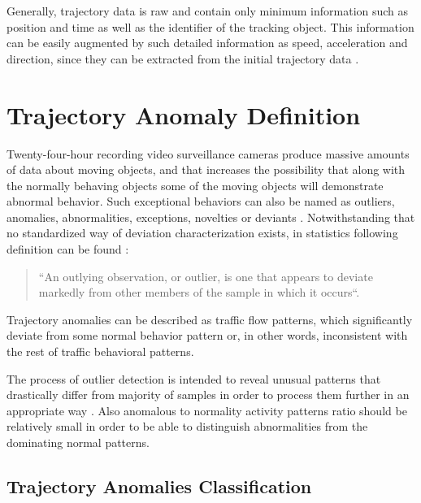 Generally, trajectory data is raw and contain only minimum information such as position and time as well as the identifier of the tracking object. This information can be easily augmented by such detailed information as speed, acceleration and direction, since they can be extracted from the initial trajectory data \cite{article:12_dssto_mot}.

\section{Trajectory Anomaly Definition}

Twenty-four-hour recording video surveillance cameras produce massive amounts of data about moving objects, and that increases the possibility that along with the normally behaving objects some of the moving objects will demonstrate abnormal behavior. Such exceptional behaviors can also be named as outliers, anomalies, abnormalities, exceptions, novelties or deviants \cite{article:11_eod_hdd}\cite{article:15_survey_ad}. Notwithstanding that no standardized way of deviation characterization exists, in statistics following definition can be found \cite{article:13_pdoos}:
\begin{quote}
	``An outlying observation, or outlier, is one that appears to deviate markedly from other members of the sample in which it occurs``.
\end{quote}

Trajectory anomalies can be described as traffic flow patterns, which significantly deviate from some normal behavior pattern or, in other words, inconsistent with the rest of traffic behavioral patterns.
 
The process of outlier detection is intended to reveal unusual patterns that drastically differ from majority of samples in order to process them further in an appropriate way \cite{article:11_eod_hdd}. Also anomalous to normality activity patterns ratio should be relatively small in order to be able to distinguish abnormalities from the dominating normal patterns.

\subsection{Trajectory Anomalies Classification}


